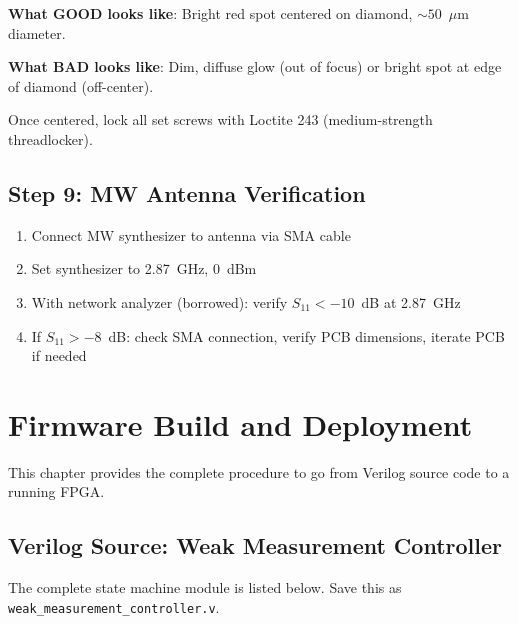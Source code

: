 \documentclass[11pt,a4paper,openany]{book}
\begin{document}
\noindent
\textbf{What GOOD looks like}: Bright red spot centered on diamond, ${\sim}50$~$\mu$m diameter.

\noindent
\textbf{What BAD looks like}: Dim, diffuse glow (out of focus) or bright spot at edge of diamond (off-center).

\noindent
Once centered, lock all set screws with Loctite 243 (medium-strength threadlocker).

\section{Step 9: MW Antenna Verification}

\begin{enumerate}[nosep]
  \item Connect MW synthesizer to antenna via SMA cable
  \item Set synthesizer to 2.87~GHz, 0~dBm
  \item With network analyzer (borrowed): verify $S_{11} < -10$~dB at 2.87~GHz
  \item If $S_{11} > -8$~dB: check SMA connection, verify PCB dimensions, iterate PCB if needed
\end{enumerate}


\chapter{Firmware Build and Deployment}\label{ch:firmware}

This chapter provides the complete procedure to go from Verilog source code to a running FPGA.

\section{Verilog Source: Weak Measurement Controller}

The complete state machine module is listed below. Save this as \texttt{weak\_measurement\_controller.v}.
\end{document}
